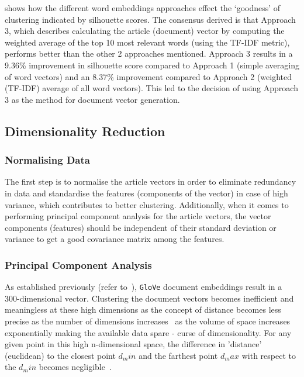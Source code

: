   \vspace{-1em}
 shows how the different word embeddings approaches effect the `goodness' of clustering indicated by silhouette scores. The consensus derived is that Approach 3, which describes calculating the article (document) vector by computing the weighted average of the top 10 most relevant words (using the TF-IDF metric), performs better than the other 2 approaches mentioned. Approach 3 results in a 9.36\% improvement in silhouette score compared to Approach 1 (simple averaging of word vectors) and an 8.37\% improvement compared to Approach 2 (weighted (TF-IDF) average of all word vectors). This led to the decision of using Approach 3 as the method for document vector generation.



\subsection{Dimensionality Reduction}

\subsubsection{Normalising Data}
The first step is to normalise the article vectors in order to eliminate redundancy in data and standardise the features (components of the vector) in case of high variance, which contributes to better clustering. Additionally, when it comes to performing principal component analysis for the article vectors, the vector components (features) should be independent of their standard deviation or variance to get a good covariance matrix among the features.  

\subsubsection{Principal Component Analysis}

As established previously (refer to~), \texttt{GloVe} document embeddings result in a 300-dimensional vector. Clustering the document vectors becomes inefficient and meaningless at these high dimensions as the concept of distance becomes less precise as the number of dimensions increases~\cite{pca_clustering} as the volume of space increases exponentially making the available data spare - curse of dimensionality. For any given point in this high n-dimensional space, the difference in 'distance' (euclidean) to the closest point $d_min$ and the farthest point $d_max$ with respect to the $d_min$ becomes negligible~\cite{nearest_neighbour}. 

